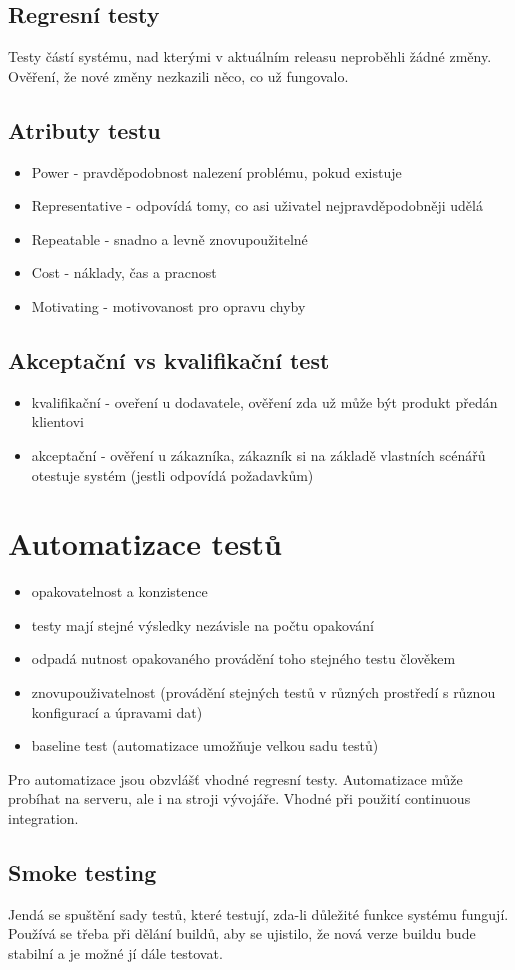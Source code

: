 \documentclass{szzclass}
\begin{document}
\subsection{Regresní testy}
Testy částí systému, nad kterými v aktuálním releasu neproběhli žádné změny.
Ověření, že nové změny nezkazili něco, co už fungovalo.
\subsection{Atributy testu}
\begin{itemize}
    \item Power - pravděpodobnost nalezení problému, pokud existuje
    \item Representative - odpovídá tomy, co asi uživatel nejpravděpodobněji udělá
    \item Repeatable - snadno a levně znovupoužitelné
    \item Cost - náklady, čas a pracnost
    \item Motivating - motivovanost pro opravu chyby
\end{itemize}
\subsection{Akceptační vs kvalifikační test}
\begin{itemize}
    \item kvalifikační - oveření u dodavatele, ověření zda už může být produkt předán klientovi
    \item akceptační - ověření u zákazníka, zákazník si na základě vlastních scénářů otestuje systém (jestli odpovídá požadavkům)
\end{itemize}
\section{Automatizace testů}
\begin{itemize}
    \item opakovatelnost a konzistence
    \item testy mají stejné výsledky nezávisle na počtu opakování
    \item odpadá nutnost opakovaného provádění toho stejného testu člověkem
    \item znovupouživatelnost (provádění stejných testů v různých prostředí s různou konfigurací a úpravami dat)
    \item baseline test (automatizace umožňuje velkou sadu testů)
\end{itemize}
Pro automatizace jsou obzvlášť vhodné regresní testy. Automatizace může probíhat na serveru, ale i na stroji vývojáře.
Vhodné při použití continuous integration.
\subsection{Smoke testing}
Jendá se spuštění sady testů, které testují, zda-li důležité funkce systému fungují. Používá se třeba při dělání buildů,
aby se ujistilo, že nová verze buildu bude stabilní a je možné jí dále testovat.
\end{document}
